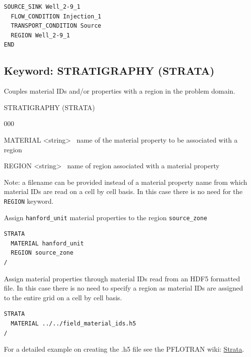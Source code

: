 \documentclass[12pt]{article}
\begin{document}
\begin{mdframed}

\begin{verbatim}
SOURCE_SINK Well_2-9_1
  FLOW_CONDITION Injection_1
  TRANSPORT_CONDITION Source
  REGION Well_2-9_1
END
\end{verbatim}

\end{mdframed}

\hyperlink{target_key}{\return}


\newpage
\protect\hypertarget{target_strata}{}

\subsection{Keyword: STRATIGRAPHY (STRATA)}

Couples material IDs and/or properties with a region in the problem domain.

\begin{deflist}{00}
\item[STRATIGRAPHY (STRATA)] ~
\begin{deflist}{000}
\item[MATERIAL] <string> \ name of the material property to be associated with a region
\item[REGION] <string> \ name of region associated with a material property
\end{deflist}
\item[\keyend]
\end{deflist}

\noindent
Note: a filename can be provided instead of a material property name from which material IDs are read on a cell by cell basis. In this case there is no need for the {\tt REGION} keyword.


\begin{mdframed}
\noindent
Assign {\tt hanford\_unit} material properties to the region {\tt source\_zone}

\begin{verbatim}
STRATA
  MATERIAL hanford_unit
  REGION source_zone
/
\end{verbatim}

\noindent
Assign material properties through material IDs read from an HDF5 formatted file. In this case there is no need to specify a region as material IDs are assigned to the entire grid on a cell by cell basis.

\begin{verbatim}
STRATA
  MATERIAL ../../field_material_ids.h5
/
\end{verbatim}

\noindent For a detailed example on creating the .h5 file see the PFLOTRAN wiki: \href{https://bitbucket.org/pflotran/pflotran-dev/wiki/Documentation/Strata}{Strata}.
\end{mdframed}
\end{document}
